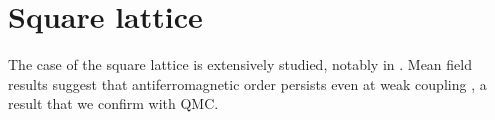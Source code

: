 \section{Square lattice}
\label{sec:square}

The case of the square lattice is extensively studied, notably in  \cite{white_numerical_1989}.
Mean field results suggest that antiferromagnetic order persists even at weak coupling \cite{claveau_mean-field_2014}, a result that we confirm with \ac{QMC}.